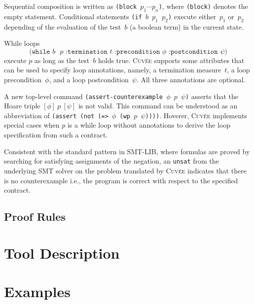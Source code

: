 \documentclass[fleqn]{llncs}
\newcommand{\Cuvee}{\textsc{Cuvée}\xspace}
\newcommand{\code}[1]{\texttt{#1}}
\newcommand{\hoaretotal}[3]{[ #1 ]~#2~[ #3 ]}
\begin{document}
Sequential composition is written as \code{(block $p_1 \cdots p_n$)}, where \code{(block)} denotes the empty statement.
Conditional statements \code{(if $b$ $p_1$ $p_2$)} execute either~$p_1$ or~$p_2$ depending of the evaluation of the test~$b$ (a boolean term) in the current state.

\medskip
\noindent
While loops
\[ \code{(while $b$ $p$ :termination $t$ :precondition $\phi$ :postcondition $\psi$)} \]
execute $p$ as long as the test~$b$ holds true.
\Cuvee supports some attributes that can be used to specify loop annotations,
namely, a termination measure~$t$, a loop precondition~$\phi$, and a loop postcondition~$\psi$.
All three annotations are optional.

\medskip

A new top-level command \code{(assert-counterexample $\phi$ $p$ $\psi$)}
asserts that the Hoare triple $\hoaretotal{\phi}{p}{\psi}$ is not valid.
This command can be understood as an abbreviation of \code{(assert (not (=> $\phi$ (wp $p$ $\psi$))))}.
Hoverer, \Cuvee implements special cases when $p$ is a while loop without annotations
to derive the loop specification from such a contract.

Consistent with the standard pattern in SMT-LIB, where formulas are proved by searching for satisfying assignments of the negation,
an \code{unsat} from the underlying SMT solver on the problem translated by \Cuvee indicates that there is no counterexample
i.e., the program is correct with respect to the specified contract.

\subsection{Proof Rules}
\label{sec:semantics}

\section{Tool Description}
\label{sec:tool}

\section{Examples}
\end{document}
